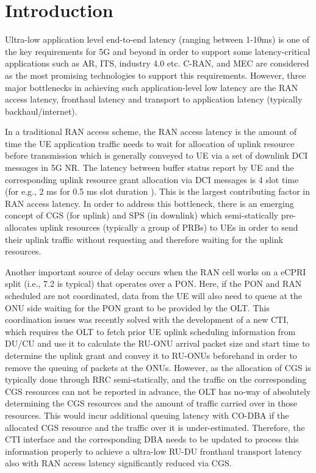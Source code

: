 \documentclass[a4paper, oneside, twocolumn, notitlepage, 10pt]{extarticle_ecoc}
\begin{document}
\section{Introduction}
	Ultra-low application level end-to-end latency (ranging between 1-10ms) is one of the key requirements for 5G and beyond in order to support some latency-critical applications such as \ac{AR}, \ac{ITS}, industry 4.0 etc. \ac{C-RAN}, and \ac{MEC} are considered as the most promising technologies to support this requirements. However, three major bottlenecks in achieving such application-level low latency are the RAN access latency, fronthaul latency and transport to application latency (typically backhaul/internet). 
	
	In a traditional RAN access scheme, the RAN access latency is the amount of time the UE application traffic needs to wait for allocation of uplink resource before transmission which is generally conveyed to UE via a set of downlink DCI messages in 5G NR. The latency between buffer status report by UE and the corresponding uplink resource grant allocation via DCI messages is 4 slot time (for e.g., 2 ms for 0.5 ms slot duration \cite{5G-NR_Dahlman}). This is the largest contributing factor in RAN access latency. In order to address this bottleneck, there is an emerging concept of \ac{CGS} (for uplink) and \ac{SPS} (in downlink) which semi-statically pre-allocates uplink resources (typically a group of \acp{PRB}) to UEs in order to send their uplink traffic without requesting and therefore waiting for the uplink resources. 
 	
 	Another important source of delay occurs when the RAN cell works on a eCPRI split (i.e., 7.2 is typical) that operates over a \ac{PON}. Here, if the PON and RAN scheduled are not coordinated, data from the UE will also need to queue at the ONU side waiting for the PON grant to be provided by the OLT. This coordination issues was recently solved with the development of a new \ac{CTI}\cite{O-RAN-CTI}, %
 	which requires the OLT to fetch prior UE uplink scheduling information from DU/CU and use it to calculate the RU-ONU arrival packet size and start time to determine the uplink grant and convey it to RU-ONUs beforehand in order to remove the queuing of packets at the ONUs. However, as the allocation of \ac{CGS} is typically done through RRC semi-statically, and the traffic on the corresponding \ac{CGS} resources can not be reported in advance, the OLT has no-way of absolutely determining the \ac{CGS} resources and the amount of traffic carried over in those resources. This would incur additional queuing latency with CO-DBA if the allocated \ac{CGS} resource and the traffic over it is under-estimated. Therefore, the CTI interface and the corresponding DBA needs to be updated to process this information properly to achieve a ultra-low RU-DU fronthaul transport latency also with RAN access latency significantly reduced via \ac{CGS}. 
 	
\end{document}
